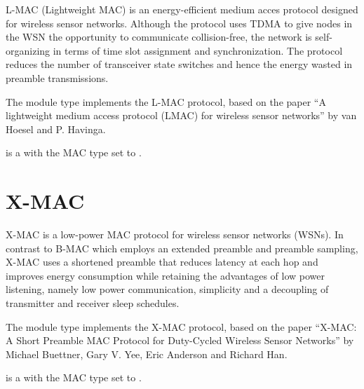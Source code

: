 L-MAC (Lightweight MAC) is an energy-efficient medium acces protocol designed
for wireless sensor networks. Although the protocol uses TDMA to give nodes
in the WSN the opportunity to communicate collision-free, the network is
self-organizing in terms of time slot assignment and synchronization.
The protocol reduces the number of transceiver state switches and hence
the energy wasted in preamble transmissions.

The  module type implements the L-MAC protocol, based on the
paper ``A lightweight medium access protocol (LMAC) for wireless sensor networks''
by van Hoesel and P. Havinga.

 is a  with the MAC type
set to .


\section{X-MAC}
\label{sec:sensor-macs:x-mac}

X-MAC is a low-power MAC protocol for wireless sensor networks (WSNs).
In contrast to B-MAC which employs an extended preamble and preamble sampling,
X-MAC uses a shortened preamble that reduces latency at each hop and
improves energy consumption while retaining the advantages
of low power listening, namely low power communication, simplicity
and a decoupling of transmitter and receiver sleep schedules.

The  module type implements the X-MAC protocol, based on
the paper ``X-MAC: A Short Preamble MAC Protocol for Duty-Cycled
Wireless Sensor Networks'' by Michael Buettner, Gary V. Yee, Eric Anderson
and Richard Han.

 is a  with the MAC type
set to .




